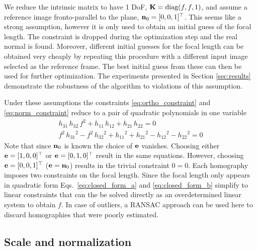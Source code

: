 \documentclass[10pt,twocolumn,letterpaper]{article}
\begin{document}

We reduce the intrinsic matrix to have 1 DoF, \ie $\mathbf{K}=\text{diag}(f, f, 1)$, and assume a reference image fronto-parallel to the plane, \ie $\mathbf{n}_0=[0,0,1]^\top$. This seems like a strong assumption, however it is only used to obtain an initial guess of the focal length. The constraint is dropped during the optimization step and the real normal is found. Moreover, different initial guesses for the focal length can be obtained very cheaply by repeating this procedure with a different input image selected as the reference frame. The best initial guess from these can then be used for further optimization. The experiments presented in Section \ref{sec:results} demonstrate the robustness of the algorithm to violations of this assumption.

Under these assumptions the constraints \eqref{eq:ortho_constraint} and \eqref{eq:norm_constraint} reduce to a pair of quadratic polynomials in one variable 
\begin{align}
h_{31}\, h_{32}\, f^2 + h_{11}\, h_{12} + h_{21}\, h_{22}=0
\label{eq:closed_form_a}
\\
f^2\, {h_{31}}^2 - f^2\, {h_{32}}^2 + {h_{11}}^2 + {h_{21}}^2 - {h_{12}}^2 - {h_{22}}^2=0
\label{eq:closed_form_b}
\end{align}
Note that since $\mathbf{n}_0$ is known the choice of $\mathbf{e}$ vanishes. Choosing either $\mathbf{e}=[1,0,0]^\top$ or $\mathbf{e}=[0,1,0]^\top$ result in the same equations. However, choosing $\mathbf{e}=[0,0,1]^\top$ (\ie $\mathbf{e}=\mathbf{n}_0$) results in the trivial constraint $0=0$. Each homography imposes two constraints on the focal length. Since the focal length only appears in quadratic form Eqs.~\eqref{eq:closed_form_a} and \eqref{eq:closed_form_b} simplify to linear constraints that can the be solved directly as an overdetermined linear system to obtain $f$. In case of outliers, a RANSAC approach can be used here to discard homographies that were poorly estimated.

\subsection{Scale and normalization}
\label{sec:calib:normalization}
\end{document}

